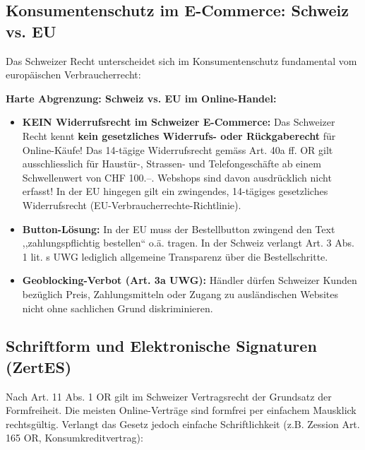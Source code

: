 \subsection{Konsumentenschutz im E-Commerce: Schweiz vs. EU}

Das Schweizer Recht unterscheidet sich im Konsumentenschutz fundamental vom europäischen Verbraucherrecht:

\begin{theorem}
    \textbf{Harte Abgrenzung: Schweiz vs. EU im Online-Handel:}
    \begin{itemize}
        \item \textbf{KEIN Widerrufsrecht im Schweizer E-Commerce:} Das Schweizer Recht kennt \textbf{kein gesetzliches Widerrufs- oder Rückgaberecht} für Online-Käufe! Das 14-tägige Widerrufsrecht gemäss Art. 40a ff. OR gilt ausschliesslich für Haustür-, Strassen- und Telefongeschäfte ab einem Schwellenwert von CHF 100.--. Webshops sind davon ausdrücklich nicht erfasst! In der EU hingegen gilt ein zwingendes, 14-tägiges gesetzliches Widerrufsrecht (EU-Verbraucherrechte-Richtlinie).
        \item \textbf{Button-Lösung:} In der EU muss der Bestellbutton zwingend den Text ,,zahlungspflichtig bestellen`` o.ä. tragen. In der Schweiz verlangt Art. 3 Abs. 1 lit. s UWG lediglich allgemeine Transparenz über die Bestellschritte.
        \item \textbf{Geoblocking-Verbot (Art. 3a UWG):} Händler dürfen Schweizer Kunden bezüglich Preis, Zahlungsmitteln oder Zugang zu ausländischen Websites nicht ohne sachlichen Grund diskriminieren.
    \end{itemize}
\end{theorem}

\subsection{Schriftform und Elektronische Signaturen (ZertES)}

Nach Art. 11 Abs. 1 OR gilt im Schweizer Vertragsrecht der Grundsatz der Formfreiheit. Die meisten Online-Verträge sind formfrei per einfachem Mausklick rechtsgültig. Verlangt das Gesetz jedoch einfache Schriftlichkeit (z.B. Zession Art. 165 OR, Konsumkreditvertrag):

